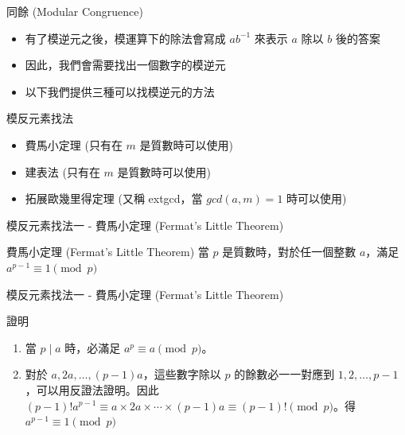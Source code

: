 \documentclass[aspectratio=169]{beamer}
\begin{document}
    \begin{frame}{同餘 (Modular Congruence)}
        \begin{itemize}
            \item 有了模逆元之後，模運算下的除法會寫成 $ab^{-1}$ 來表示 $a$ 除以 $b$ 後的答案
            \item 因此，我們會需要找出一個數字的模逆元
            \item 以下我們提供三種可以找模逆元的方法
        \end{itemize}
    \end{frame}
    
    \begin{frame}{模反元素找法}
        \begin{itemize}
            \item 費馬小定理 (只有在 $m$ 是質數時可以使用)
            \item 建表法 (只有在 $m$ 是質數時可以使用)
            \item 拓展歐幾里得定理 (又稱 extgcd，當 $gcd(a,m) = 1$ 時可以使用)
        \end{itemize}
    \end{frame}
    
    \begin{frame}{模反元素找法一 - 費馬小定理 (Fermat's Little Theorem)}
        \begin{alertblock}{費馬小定理 (Fermat's Little Theorem)}
            當 $p$ 是質數時，對於任一個整數 $a$，滿足 $a^{p-1} \equiv 1 \pmod p$
        \end{alertblock}
    \end{frame}
    
    \begin{frame}{模反元素找法一 - 費馬小定理 (Fermat's Little Theorem)}
        \begin{block}{證明}
            \begin{enumerate}
                \item 當 $p \mid a$ 時，必滿足 $a^p \equiv a \pmod p$。
                \item 對於 $a,2a,\ldots,(p-1)a$，這些數字除以 $p$ 的餘數必一一對應到 $1,2,\ldots,p-1$，可以用反證法證明。因此 $(p-1)!a^{p-1} \equiv a \times 2a \times \cdots \times (p-1)a \equiv (p-1)! \pmod p$。得 $a^{p-1}\equiv 1 \pmod p$
            \end{enumerate}
        \end{block}
    \end{frame}
    
\end{document}

